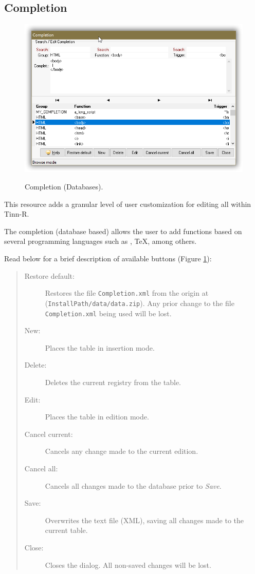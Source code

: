\subsection{Completion}

\begin{figure}[H]
  \includegraphics[scale=0.35]{./res/completion_dlg.png}\\
  \caption{Completion (Databases).}
  \label{fig:completion_dlg}
\end{figure}

This resource adds a granular level of user customization for editing
all within Tinn-R.

The completion (database based) allows the user to add functions based
on several programming languages such as \RR{}, \TeX, among others.

Read below for a brief description of available buttons (Figure \ref{fig:completion_dlg}):

\begin{quote}
  \begin{footnotesize}
    \begin{description}
      \item[Restore default:]
        Restores the file \texttt{Completion.xml} from the origin at
        (\texttt{InstallPath/data/data.zip}). Any prior change to the file
        \texttt{Completion.xml} being used will be lost.
      \item[New:]
        Places the table in insertion mode.
      \item[Delete:]
        Deletes the current registry from the table.
      \item[Edit:]
        Places the table in edition mode.
      \item[Cancel current:]
        Cancels any change made to the current edition.
      \item[Cancel all:]
        Cancels all changes made to the database prior to \textit{Save}.
      \item[Save:]
        Overwrites the text file (XML), saving all changes made to the current table.
      \item[Close:]
        Closes the dialog. All non-saved changes will be lost.
    \end{description}
  \end{footnotesize}
\end{quote}


